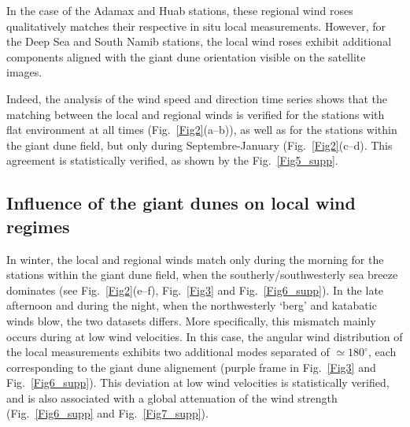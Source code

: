   In the case of the Adamax and Huab stations, these regional wind roses qualitatively matches their respective in situ local measurements. However, for the Deep Sea and South Namib stations, the local wind roses exhibit additional components aligned with the giant dune orientation visible on the satellite images.

  Indeed, the analysis of the wind speed and direction time series shows that the matching between the local and regional winds is verified for the stations with flat environment at all times (Fig.~\ref{Fig2}(a--b)), as well as for the stations within the giant dune field, but only during Septembre-January (Fig.~\ref{Fig2}(c--d). This agreement is statistically verified, as shown by the Fig.~\ref{Fig5_supp}.

  \subsection{Influence of the giant dunes on local wind regimes}

  In winter, the local and regional winds match only during the morning for the stations within the giant dune field, when the southerly/southwesterly sea breeze dominates (see Fig.~\ref{Fig2}(e--f), Fig.~\ref{Fig3} and Fig.~\ref{Fig6_supp}). In the late afternoon and during the night, when the northwesterly `berg' and katabatic winds blow, the two datasets differs. More specifically, this mismatch mainly occurs during at low wind velocities. In this case, the angular wind distribution of the local measurements exhibits two additional modes separated of $\simeq 180^\circ$, each corresponding to the giant dune alignement (purple frame in Fig.~\ref{Fig3} and Fig.~\ref{Fig6_supp}). This deviation at low wind velocities is statistically verified, and is also associated with a global attenuation of the wind strength (Fig.~\ref{Fig6_supp} and Fig.~\ref{Fig7_supp}).

